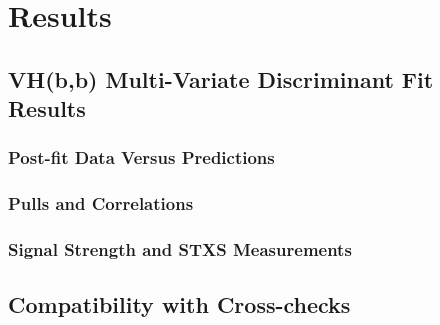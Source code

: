 \chapter{Results}%
\label{ch:results}
\section{VH(b,b) Multi-Variate Discriminant Fit Results}%
\label{sec:mva-results}
\subsection{Post-fit Data Versus Predictions}







\subsection{Pulls and Correlations}

\subsection{Signal Strength and STXS Measurements}

\section{Compatibility with Cross-checks}

